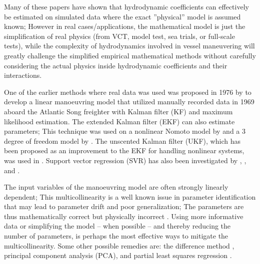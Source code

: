 Many of these papers have shown that hydrodynamic coefficients can effectively be estimated on simulated data where the exact ''physical'' model is assumed known; However in real cases/applications, the mathematical model is just the simplification of real physics (from VCT, model test, sea trials, or full-scale tests), while the complexity of hydrodynamics involved in vessel maneuvering will greatly challenge the simplified empirical mathematical methods without carefully considering the actual physics inside hydrodynamic coefficients and their interactions.

One of the earlier methods where real data was used was proposed in 1976 by \citet{astrom_identification_1976} to develop a linear manoeuvring model that utilized manually recorded data in 1969 aboard the Atlantic Song freighter with Kalman filter (KF) and maximum likelihood estimation. 
The extended Kalman filter (EKF) can also estimate parameters; This technique was used on a nonlinear Nomoto model by \citet{perera_system_2015} and a 3 degree of freedom model by \citet{shi_identification_2009}. The unscented Kalman filter (UKF), which has been proposed as an improvement to the EKF for handling nonlinear systems, was used in \citet{revestido_herrero_two-step_2012}.
Support vector regression (SVR) has also been investigated by \citet{luo_parameter_2016}, \citet{zhu_parameter_2017}, and \citet{wang_parameter_2021}. 

%
The input variables of the manoeuvring model are often strongly linearly dependent; This multicollinearity is a well known issue in parameter identification that may lead to parameter drift and poor generalization; The parameters are thus mathematically correct but physically incorrect \citep{luo_parameter_2016}. 
Using more informative data or simplifying the model -- when possible -- and thereby reducing the number of parameters, is perhaps the most effective ways to mitigate the multicollinearity.
Some other possible remedies are: the difference method \citep{luo_parameter_2016}, principal component analysis (PCA), and partial least squares regression \citep{jian-chuan_parametric_2015}. 

